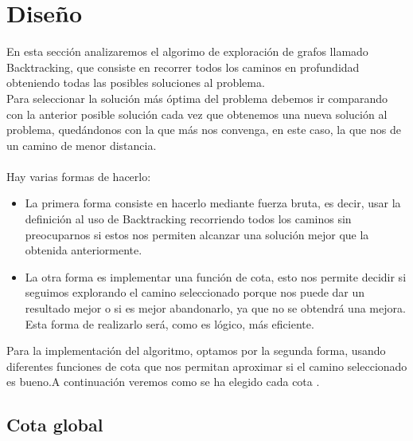 \documentclass[11pt,openany]{book}
\begin{document}
\section{Diseño}   
En esta sección analizaremos el algorimo de exploración de grafos llamado Backtracking, que consiste en recorrer todos los caminos en profundidad obteniendo todas
las posibles soluciones al problema. \\
Para seleccionar la solución más óptima del problema debemos ir comparando con la anterior posible solución  cada vez que obtenemos una nueva solución al problema, quedándonos con la que más nos
convenga, en este caso, la que nos de un camino de menor distancia.
\\ \\
Hay varias formas de hacerlo:
\begin{itemize}
      \item La primera forma consiste en hacerlo mediante fuerza bruta, es decir, usar la definición al uso de Backtracking recorriendo todos los caminos sin preocuparnos
      si estos nos permiten alcanzar una solución mejor que la obtenida anteriormente.
      \item La otra forma es implementar una función de cota, esto nos permite decidir si seguimos explorando el camino seleccionado porque nos puede dar un resultado mejor
      o si es mejor abandonarlo, ya que no se obtendrá una mejora.
      Esta forma de realizarlo será, como es lógico, más eficiente.
\end{itemize}

Para la implementación del algoritmo, optamos por la segunda forma, usando diferentes funciones de cota que nos permitan aproximar si el camino seleccionado es bueno.A continuación
veremos como se ha elegido cada cota .
\subsection{Cota global}
\end{document}
